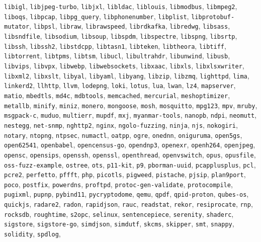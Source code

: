 {\texttt{libigl}, \texttt{libjpeg-turbo}, \texttt{libjxl}, \texttt{libldac}, \texttt{liblouis}, \texttt{libmodbus}, \texttt{libmpeg2}, \texttt{liboqs}, \texttt{libpcap}, \texttt{libpg\_query}, \texttt{libphonenumber}, \texttt{libplist}, \texttt{libprotobuf-mutator}, \texttt{libpsl}, \texttt{libraw}, \texttt{librawspeed}, \texttt{librdkafka}, \texttt{libredwg}, \texttt{libsass}, \texttt{libsndfile}, \texttt{libsodium}, \texttt{libsoup}, \texttt{libspdm}, \texttt{libspectre}, \texttt{libspng}, \texttt{libsrtp}, \texttt{libssh}, \texttt{libssh2}, \texttt{libstdcpp}, \texttt{libtasn1}, \texttt{libteken}, \texttt{libtheora}, \texttt{libtiff}, \texttt{libtorrent}, \texttt{libtpms}, \texttt{libtsm}, \texttt{libucl}, \texttt{libultrahdr}, \texttt{libunwind}, \texttt{libusb}, \texttt{libvips}, \texttt{libvpx}, \texttt{libwebp}, \texttt{libwebsockets}, \texttt{libxaac}, \texttt{libxls}, \texttt{libxlsxwriter}, \texttt{libxml2}, \texttt{libxslt}, \texttt{libyal}, \texttt{libyaml}, \texttt{libyang}, \texttt{libzip}, \texttt{libzmq}, \texttt{lighttpd}, \texttt{lima}, \texttt{linkerd2}, \texttt{llhttp}, \texttt{llvm}, \texttt{lodepng}, \texttt{loki}, \texttt{lotus}, \texttt{lua}, \texttt{lwan}, \texttt{lz4}, \texttt{mapserver}, \texttt{matio}, \texttt{mbedtls}, \texttt{md4c}, \texttt{mdbtools}, \texttt{memcached}, \texttt{mercurial}, \texttt{meshoptimizer}, \texttt{metallb}, \texttt{minify}, \texttt{miniz}, \texttt{monero}, \texttt{mongoose}, \texttt{mosh}, \texttt{mosquitto}, \texttt{mpg123}, \texttt{mpv}, \texttt{mruby}, \texttt{msgpack-c}, \texttt{muduo}, \texttt{multierr}, \texttt{mupdf}, \texttt{mxj}, \texttt{myanmar-tools}, \texttt{nanopb}, \texttt{ndpi}, \texttt{neomutt}, \texttt{nestegg}, \texttt{net-snmp}, \texttt{nghttp2}, \texttt{nginx}, \texttt{ngolo-fuzzing}, \texttt{ninja}, \texttt{njs}, \texttt{nokogiri}, \texttt{notary}, \texttt{ntopng}, \texttt{ntpsec}, \texttt{numactl}, \texttt{oatpp}, \texttt{ogre}, \texttt{onednn}, \texttt{oniguruma}, \texttt{open5gs}, \texttt{open62541}, \texttt{openbabel}, \texttt{opencensus-go}, \texttt{opendnp3}, \texttt{openexr}, \texttt{openh264}, \texttt{openjpeg}, \texttt{opensc}, \texttt{opensips}, \texttt{openssh}, \texttt{openssl}, \texttt{openthread}, \texttt{openvswitch}, \texttt{opus}, \texttt{opusfile}, \texttt{oss-fuzz-example}, \texttt{ostree}, \texttt{ots}, \texttt{p11-kit}, \texttt{p9}, \texttt{pborman-uuid}, \texttt{pcapplusplus}, \texttt{pcl}, \texttt{pcre2}, \texttt{perfetto}, \texttt{pffft}, \texttt{php}, \texttt{picotls}, \texttt{pigweed}, \texttt{pistache}, \texttt{pjsip}, \texttt{plan9port}, \texttt{poco}, \texttt{postfix}, \texttt{powerdns}, \texttt{proftpd}, \texttt{protoc-gen-validate}, \texttt{protocompile}, \texttt{pugixml}, \texttt{pupnp}, \texttt{pybind11}, \texttt{pycryptodome}, \texttt{qemu}, \texttt{qpdf}, \texttt{qpid-proton}, \texttt{qubes-os}, \texttt{quickjs}, \texttt{radare2}, \texttt{radon}, \texttt{rapidjson}, \texttt{rauc}, \texttt{readstat}, \texttt{rekor}, \texttt{resiprocate}, \texttt{rnp}, \texttt{rocksdb}, \texttt{roughtime}, \texttt{s2opc}, \texttt{selinux}, \texttt{sentencepiece}, \texttt{serenity}, \texttt{shaderc}, \texttt{sigstore}, \texttt{sigstore-go}, \texttt{simdjson}, \texttt{simdutf}, \texttt{skcms}, \texttt{skipper}, \texttt{smt}, \texttt{snappy}, \texttt{solidity}, \texttt{spdlog}, }
